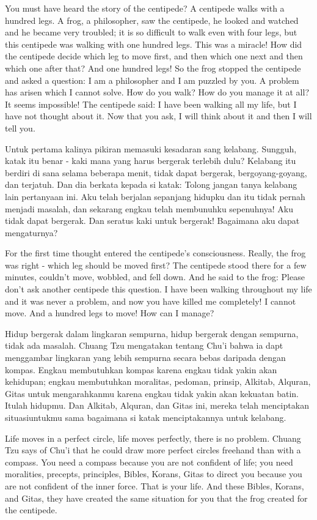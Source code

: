 \english
You must have heard the story of the centipede? A centipede walks with a hundred legs. A frog, a philosopher, saw the centipede, he looked and watched and he became very troubled; it is so difficult to walk even with four legs, but this centipede was walking with one hundred legs. This was a miracle! How did the centipede decide which leg to move first, and then which one next and then which one after that? And one hundred legs! So the frog stopped the centipede and asked a question: I am a philosopher and I am puzzled by you. A problem has arisen which I cannot solve. How do you walk? How do you manage it at all? It seems impossible! The centipede said: I have been walking all my life, but I have not thought about it. Now that you ask, I will think about it and then I will tell you.

\bahasa
Untuk pertama kalinya pikiran memasuki kesadaran sang kelabang. Sungguh, katak itu benar - kaki mana yang harus bergerak terlebih dulu? Kelabang itu berdiri di sana selama beberapa menit, tidak dapat bergerak, bergoyang-goyang, dan terjatuh. Dan dia berkata kepada si katak: Tolong jangan tanya kelabang lain pertanyaan ini. Aku telah berjalan sepanjang hidupku dan itu tidak pernah menjadi masalah, dan sekarang engkau telah membunuhku sepenuhnya! Aku tidak dapat bergerak. Dan seratus kaki untuk bergerak! Bagaimana aku dapat mengaturnya?

\english
For the first time thought entered the centipede's consciousness. Really, the frog was right - which leg should be moved first? The centipede stood there for a few minutes, couldn't move, wobbled, and fell down. And he said to the frog: Please don't ask another centipede this question. I have been walking throughout my life and it was never a problem, and now you have killed me completely! I cannot move. And a hundred legs to move! How can I manage?

\bahasa
Hidup bergerak dalam lingkaran sempurna, hidup bergerak dengan sempurna, tidak ada masalah. Chuang Tzu mengatakan tentang Chu'i bahwa ia dapt menggambar lingkaran yang lebih sempurna secara bebas daripada dengan kompas. Engkau membutuhkan kompas karena engkau tidak yakin akan kehidupan; engkau membutuhkan moralitas, pedoman, prinsip, Alkitab, Alquran, Gitas untuk mengarahkanmu karena engkau tidak yakin akan kekuatan batin. Itulah hidupmu. Dan Alkitab, Alquran, dan Gitas ini, mereka telah menciptakan situasiuntukmu sama bagaimana si katak menciptakannya untuk kelabang.

\english
Life moves in a perfect circle, life moves perfectly, there is no problem. Chuang Tzu says of Chu'i that he could draw more perfect circles freehand than with a compass. You need a compass because you are not confident of life; you need moralities, precepts, principles, Bibles, Korans, Gitas to direct you because you are not confident of the inner force. That is your life. And these Bibles, Korans, and Gitas, they have created the same situation for you that the frog created for the centipede.

